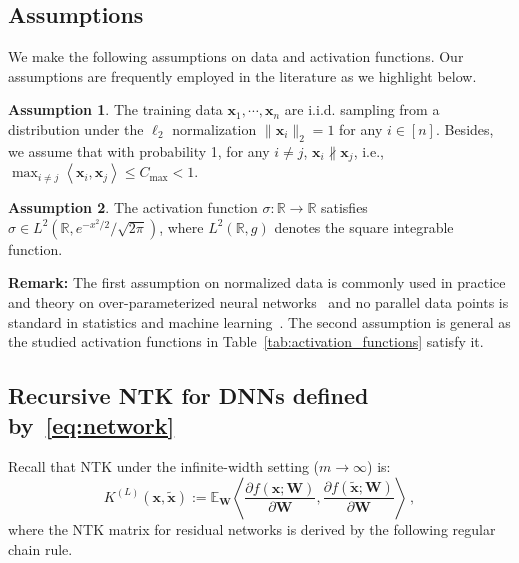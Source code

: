 \documentclass[nohyperref]{article}
\theoremstyle{plain}
\theoremstyle{definition}
\newtheorem{assumption}{Assumption}
\theoremstyle{remark}
\begin{document}
\subsection{Assumptions}
\label{ssec:assumptions}

We make the following assumptions on data and activation functions. Our assumptions are frequently employed in the literature as we highlight below. 

\begin{assumption}
\label{assumption:distribution_1}
The training data $\bm{x}_1,\cdots,\bm{x}_n$ are i.i.d. sampling from a distribution under the $\ell_2$ normalization $\| \bm{x}_i \|_{2} = 1$ for any $i \in [n]$.
Besides, we assume that with probability 1, for any $i\neq j$, $\bm{x}_i\nparallel \bm{x}_j$, i.e., $\max_{i\neq j} \left \langle \bm{x}_i, \bm{x}_j \right \rangle \leq C_{\max} < 1$.
\end{assumption}

\begin{assumption}
\label{assumption:activation_functions}
The activation function $\sigma: \mathbb{R} \rightarrow \mathbb{R}$ satisfies $\sigma \in L^2(\mathbb{R}, e^{-x^2/2}/\sqrt{2\pi})$, where $L^2(\mathbb{R}, g)$ denotes the square integrable function.
\end{assumption}

{\bf Remark:} The first assumption on normalized data is commonly used in practice and theory on over-parameterized neural networks~\citep{du2018gradient, du2019gradient, pmlr-v97-allen-zhu19a, oymak2020toward, pmlr-v119-malach20a} and no parallel data points is standard in statistics and machine learning~\citep{du2018gradient,du2019gradient}. The second assumption is general as the studied activation functions in Table~\ref{tab:activation_functions} satisfy it.


\subsection{Recursive NTK for DNNs defined by~\cref{eq:network}}
\label{ssec:Recursive_NTK}

Recall that NTK \citep{jacot2018neural} under the infinite-width setting ($m\to \infty$) is:
\begin{equation*}
K^{(L)}(\bm{x},\widetilde{\bm{x}}) := \mathbb{E}_{\bm{W}}\left \langle \frac{\partial f(\bm{x};\bm{W})}{\partial\bm{W}},\frac{\partial f(\widetilde{\bm{x}};\bm{W})}{\partial\bm{W}}  \right \rangle\,,
\end{equation*}
where the NTK matrix for residual networks is derived by the following regular chain rule.
\end{document}

